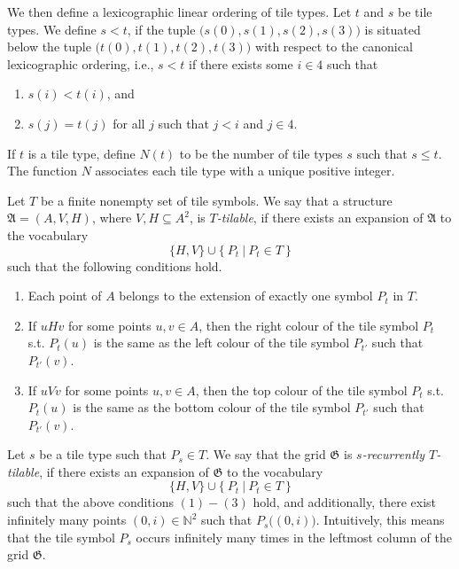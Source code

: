 \documentclass{LMCS}
\theoremstyle{plain}
\newcommand{\mf}{\mathfrak}
\begin{document}
%
We then define a lexicographic linear ordering of tile types.
%
Let $t$ and $s$ be tile types. We define $s < t$, if the tuple $\bigl(s(0),s(1),s(2),s(3)\bigr)$
%
is situated below the tuple $\bigl(t(0),t(1),t(2),t(3)\bigr)$ with respect to the canonical lexicographic ordering, i.e.,
%
$s < t$ if there exists some $i\in 4$ such that
%
%
%
\begin{enumerate}
%
\item
$s(i) < t(i)$, and
%
\item
$s(j) = t(j)$ for all $j$ such that $j<i$ and $j\in 4$.
%
\end{enumerate}
%
If $t$ is a tile type, define $N(t)$ to be the number of tile types $s$ such that $s\leq t$. The function $N$ associates
%
each tile type with a unique positive integer. 
% 


%
Let $T$ be a finite nonempty set of tile symbols. We say that a structure $\mf{A}=(A,V,H)$, where $V,H\subseteq A^2$, is
%
\emph{$T$-tilable}, if there exists an expansion of $\mf{A}$ to
%
the vocabulary
%
%
%
$$\{H,V\}\cup\{\ P_t\ |\ P_t\in T\ \}$$
%
%
%
such that the following conditions hold.
%
%
%
\begin{enumerate}
%
\item
Each point of $A$ belongs to the extension of
%
exactly one symbol $P_t$ in $T$.
%
\item
If $u H v$ for some points $u,v\in A$,
%
then the right colour of the tile symbol $P_t$ s.t. $P_{t}(u)$ is the same as the left
%
colour of the tile symbol $P_{t'}$ such that $P_{t'}(v)$.
%
\item
If $u V v$ for some points $u,v\in A$,
%
then the top colour of the tile symbol $P_t$ s.t. $P_{t}(u)$ is the same as the bottom
%
colour of the tile symbol $P_{t'}$ such that $P_{t'}(v)$.
%
\end{enumerate}
%
%
%
Let $s$ be a tile type
%
such that $P_s\in T$. We say that the grid $\mf{G}$ is \emph{$s$-recurrently $T$-tilable}, if
%
there exists an expansion of $\mf{G}$ to the vocabulary
%
%
%
$$\{H,V\}\cup\{\ P_t\ |\ P_t\in T\ \}$$
%
%
%
such that
%
the above conditions $(1) - (3)$ hold, and additionally,
%
there exist infinitely many points $(0,i)\in\mathbb{N}^2$
%
such that $P_s\bigl((0,i)\bigr)$. 
%
Intuitively, this means that the tile symbol $P_s$ occurs infinitely many 
%
times in the leftmost column of the grid $\mf{G}$.
%
\end{document}
